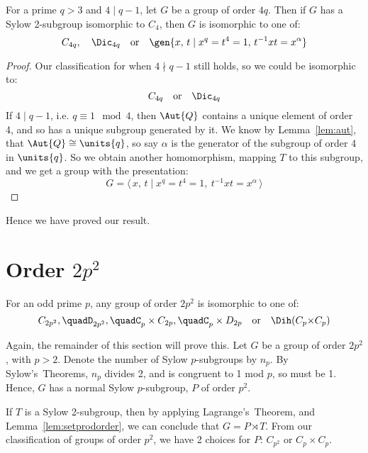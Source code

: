 \begin{lemma}
    For a prime \(q > 3\) and \(4 \mid q-1\), let \(G\) be a group of order \(4q\).
    Then if \(G\) has a Sylow 2-subgroup isomorphic to \(C_{4}\), then \(G\) is isomorphic to one of:
    \[%
        C_{4q}, \quad%
        \Dic_{4q} \quad \text{or} \quad%
        \gen{x,\, t \mid x^q = t^4 = 1,\, t^{-1}xt = x^\alpha}
    \]
\end{lemma}

\begin{proof}
    Our classification for when \(4 \nmid q-1\) still holds, so we could be isomorphic to:
    \[
        C_{4q} \quad \text{or} \quad%
        \Dic_{4q}%
    \]
    If \(4 \mid q-1\), i.e. \(q \equiv 1 \mod{4}\), then \(\Aut{Q}\) contains a unique element of order 4, and so
    has a unique subgroup generated by it.
    We know by Lemma~\ref{lem:aut}, that \(\Aut{Q} \cong \units{q}\), so say \(\alpha\) is the generator of the
    subgroup of order 4 in \(\units{q}\).
    So we obtain another homomorphism, mapping \(T\) to this subgroup, and we get a group with the presentation:
    \[G = \langle\, x,\,t \mid x^q = t^4 = 1,\ t^{-1}xt = x^{\alpha}\,\rangle\]
\end{proof}

Hence we have proved our result.

\section{Order \(2p^2\)}
\begin{theorem}\label{thm:2p_squared}
    For an odd prime \(p\), any group of order \(2p^2\) is isomorphic to one of:
    \[%
        C_{2p^2}, \quad%
        D_{2p^2}, \quad%
        C_p \times C_{2p}, \quad%
        C_p \times D_{2p} \quad \text{or} \quad%
        \Dih(C_p {\times} C_p)
    \]
\end{theorem}

Again, the remainder of this section will prove this.
Let \(G\) be a group of order \(2p^2\), with \(p > 2\).
Denote the number of Sylow \(p\)-subgroups by \(n_p\).
By Sylow's~Theorems, \(n_p\) divides 2, and is congruent to 1 mod \(p\), so must be 1.
Hence, \(G\) has a normal Sylow \(p\)-subgroup, \(P\) of order \(p^2\).

If \(T\) is a Sylow 2-subgroup, then by applying Lagrange's~Theorem, and Lemma~\ref{lem:setprodorder}, we can conclude
that \(G = P \rtimes T\).
From our classification of groups of order \(p^2\), we have 2 choices for \(P\): \(C_{p^2}\) or \(C_{p} \times C_{p}\).

